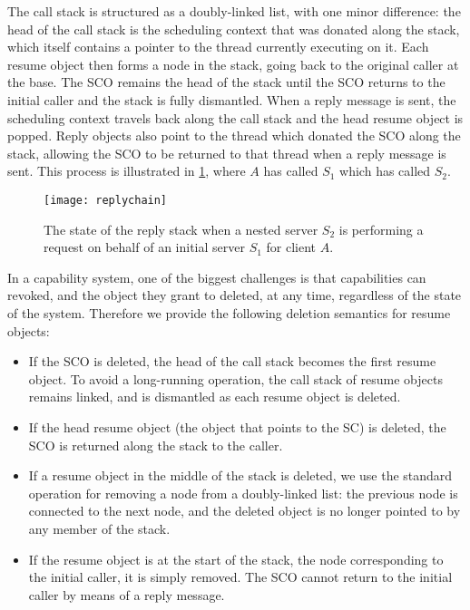 The call stack is structured as a doubly-linked list, with one minor difference: the head of the
call stack is the scheduling context that was donated along the stack, which itself contains a
pointer to the thread currently executing on it. Each resume object then forms a node in the
stack, going back to the original caller at the base. The \gls{SCO} remains the head of the stack
until the \gls{SCO} returns to the initial caller and the stack is fully dismantled.  When a reply
message is sent, the scheduling context travels back along the call stack and the head resume object
is popped.  Reply objects also point to the thread which donated the \gls{SCO} along the stack,
allowing the SCO to be returned to that thread when a reply message is sent.  This process is
illustrated in \cref{f:reply-stack}, where $A$ has called $S_{1}$ which has called  $S_{2}$.

\begin{figure}[t]
    \centering
    \texttt{[image: replychain]}
    \caption[Reply stack example]{The state of the reply stack when a nested server $S_{2}$ is
performing a request on behalf of an initial server $S_{1}$ for client $A$.}
    \label{f:reply-stack}
\end{figure}

In a capability system, one of the biggest challenges is that capabilities can revoked, and the
object they grant to deleted, at any time, regardless of the state of the system. Therefore
we provide the following deletion semantics for resume objects:

\begin{itemize}
    \item If the \gls{SCO} is deleted, the head of the call stack becomes the first resume object. To avoid
        a long-running operation, the call stack of resume objects remains linked, and is dismantled
        as each resume object is deleted.
    \item If the head resume object (the object that points to the SC) is deleted, the \gls{SCO} is
        returned along the stack to the caller. 
    \item If a resume object in the middle of the stack is deleted, we use the standard operation 
        for removing
        a node from a doubly-linked list: the previous node is connected to the next node,
        and the deleted object is no longer pointed to by any member of the stack.
    \item If the resume object is at the start of the stack, \ie the node corresponding to the initial
        caller, it is simply removed. The \gls{SCO} cannot return to the initial caller by means of a reply
        message.
\end{itemize}
\clearpage


